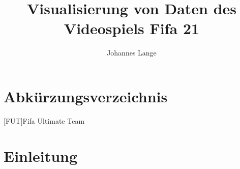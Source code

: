 \documentclass[usegeometry=true]{scrartcl}
\begin{document}
\subject{Projektbericht zum Modul Information Retrieval und Visualisierung Sommersemester 2021}
\title{Visualisierung von Daten des Videospiels Fifa 21}
\author{Johannes Lange}%
\maketitle%
%
\newpage
\tableofcontents
\newpage

\clearpage
\listoffigures

\section*{Abkürzungsverzeichnis}\label{AV}
	\begin{acronym}
	[FUT]{Fifa Ultimate Team}
	\end{acronym}
\newpage
\section{Einleitung}


\end{document}
